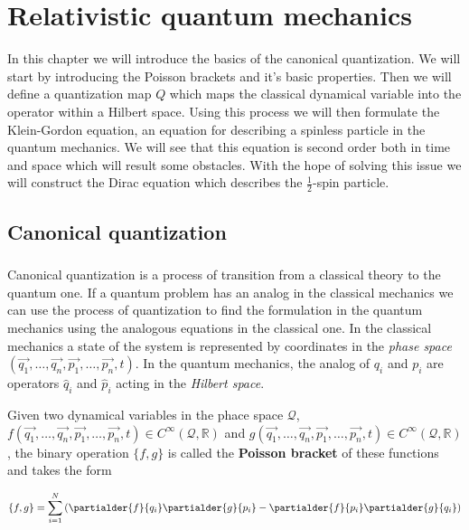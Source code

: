 \chapter{Relativistic quantum mechanics}

In this chapter we will introduce the basics of the canonical quantization. We will start by introducing the
Poisson brackets and it's basic properties. Then we will define a quantization map $Q$ which maps the
classical dynamical variable into the operator within a Hilbert space. Using this process we will then
formulate the Klein-Gordon equation, an equation for describing a spinless particle in the quantum mechanics.
We will see that this equation is second order both in time and space which will result some obstacles. With the
hope of solving this issue we will construct the Dirac equation which describes the $\frac{1}{2}$-spin particle.

\section{Canonical quantization}

\paragraph{} Canonical quantization is a process of transition from a classical theory to the quantum one. If a 
quantum problem has an analog in the classical mechanics we can use the process of quantization to find the formulation
in the quantum mechanics using the analogous equations in the classical one. In the classical mechanics a state of the system
is represented by coordinates in the \textit{phase space} $(\vec{q_{1}}, \dots, \vec{q_{n}}, \vec{p_{1}}, \dots, \vec{p_{n}}, t)$.
In the quantum mechanics, the analog of $q_{i}$ and $p_{i}$ are operators $\hat{q}_{i}$ and $\hat{p}_{i}$ acting in the 
\textit{Hilbert space}.

\begin{definition}
    \label{df:poisson}
    Given two dynamical variables in the phace space $\mathcal{Q}$, \newline $f(\vec{q_{1}}, \dots, \vec{q_{n}}, \vec{p_{1}}, \dots, \vec{p_{n}}, t) 
    \in C^{\infty}(\mathcal{Q}, \mathbb{R})$ and $g(\vec{q_{1}}, \dots, \vec{q_{n}}, \vec{p_{1}}, \dots, \vec{p_{n}}, t) 
    \in C^{\infty}(\mathcal{Q}, \mathbb{R})$, the binary operation $\{f, g\}$ is called the \textbf{Poisson bracket} of these functions and takes the form

    \begin{equation}
        \{f, g\} = \sum_{i=1}^{N}\left(\partialder{f}{q_{i}} \partialder{g}{p_{i}} - \partialder{f}{p_{i}} \partialder{g}{q_{i}}\right)
    \end{equation}
\end{definition}

